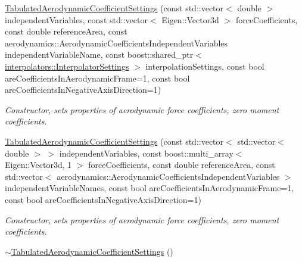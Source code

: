 \begin{DoxyCompactItemize}
\hyperlink{classtudat_1_1simulation__setup_1_1TabulatedAerodynamicCoefficientSettings_3_011_01_4_a3013fed4b51b91392495349e5543c745}{Tabulated\+Aerodynamic\+Coefficient\+Settings} (const std\+::vector$<$ double $>$ independent\+Variables, const std\+::vector$<$ Eigen\+::\+Vector3d $>$ force\+Coefficients, const double reference\+Area, const aerodynamics\+::\+Aerodynamic\+Coefficients\+Independent\+Variables independent\+Variable\+Name, const boost\+::shared\+\_\+ptr$<$ \hyperlink{classtudat_1_1interpolators_1_1InterpolatorSettings}{interpolators\+::\+Interpolator\+Settings} $>$ interpolation\+Settings, const bool are\+Coefficients\+In\+Aerodynamic\+Frame=1, const bool are\+Coefficients\+In\+Negative\+Axis\+Direction=1)
\begin{DoxyCompactList}\small\item\em Constructor, sets properties of aerodynamic force coefficients, zero moment coefficients. \end{DoxyCompactList}\item 
\hyperlink{classtudat_1_1simulation__setup_1_1TabulatedAerodynamicCoefficientSettings_3_011_01_4_a414a049dd7beef7305fd3e3164c13edf}{Tabulated\+Aerodynamic\+Coefficient\+Settings} (const std\+::vector$<$ std\+::vector$<$ double $>$ $>$ independent\+Variables, const boost\+::multi\+\_\+array$<$ Eigen\+::\+Vector3d, 1 $>$ force\+Coefficients, const double reference\+Area, const std\+::vector$<$ aerodynamics\+::\+Aerodynamic\+Coefficients\+Independent\+Variables $>$ independent\+Variable\+Names, const bool are\+Coefficients\+In\+Aerodynamic\+Frame=1, const bool are\+Coefficients\+In\+Negative\+Axis\+Direction=1)
\begin{DoxyCompactList}\small\item\em Constructor, sets properties of aerodynamic force coefficients, zero moment coefficients. \end{DoxyCompactList}\item 
\hyperlink{classtudat_1_1simulation__setup_1_1TabulatedAerodynamicCoefficientSettings_3_011_01_4_a054261d903f39ba3b0eb493f7c52431f}{$\sim$\+Tabulated\+Aerodynamic\+Coefficient\+Settings} ()\hypertarget{classtudat_1_1simulation__setup_1_1TabulatedAerodynamicCoefficientSettings_3_011_01_4_a054261d903f39ba3b0eb493f7c52431f}{}\label{classtudat_1_1simulation__setup_1_1TabulatedAerodynamicCoefficientSettings_3_011_01_4_a054261d903f39ba3b0eb493f7c52431f}


\end{DoxyCompactItemize}
